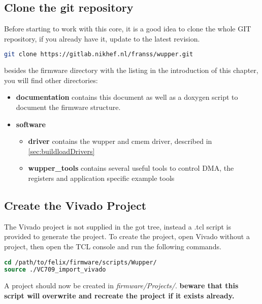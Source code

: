 \subsection{Clone the git repository}
Before starting to work with this core, it is a good idea to clone the whole GIT repository, if you already have it, update to the latest revision.
\begin{lstlisting}[frame=single, language=Bash, caption=git clone]
git clone https://gitlab.nikhef.nl/franss/wupper.git
\end{lstlisting}
besides the firmware directory with the listing in the introduction of this chapter, you will find other directories:\\
\begin{itemize}
\item \textbf{documentation} contains this document as well as a doxygen script to document the firmware structure.
\item \textbf{software}
	\begin{itemize}
		\item \textbf{driver} contains the wupper and cmem driver, described in \ref{sec:buildloadDrivers}
		\item \textbf{wupper\_tools} contains several useful tools to control DMA, the registers and application specific example tools
	\end{itemize}
\end{itemize}

\subsection{Create the Vivado Project}
The Vivado project is not supplied in the got tree, instead a .tcl script is provided to generate the project. To create the project, open Vivado without a project, then open the TCL console and run the following commands.
\begin{lstlisting}[frame=single, language=tcl,     caption=Create Vivado Project]
cd /path/to/felix/firmware/scripts/Wupper/
source ./VC709_import_vivado
\end{lstlisting}
A project should now be created in \textit{firmware/Projects/}. \textbf{beware that this script will overwrite and recreate the project if it exists already.}


